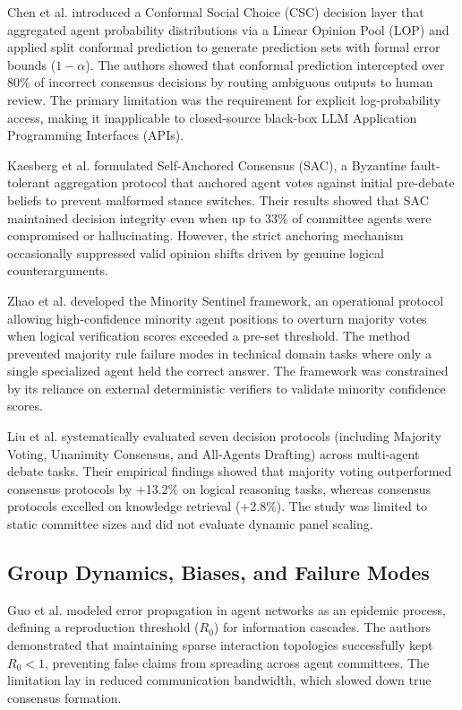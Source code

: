 \documentclass[a4paper,fleqn]{cas-sc}
\begin{document}
Chen et al. \cite{21} introduced a Conformal Social Choice (CSC) decision layer that aggregated agent probability distributions via a Linear Opinion Pool (LOP) and applied split conformal prediction to generate prediction sets with formal error bounds ($1 - \alpha$). The authors showed that conformal prediction intercepted over 80\% of incorrect consensus decisions by routing ambiguous outputs to human review. The primary limitation was the requirement for explicit log-probability access, making it inapplicable to closed-source black-box LLM Application Programming Interfaces (APIs).

Kaesberg et al. \cite{36} formulated Self-Anchored Consensus (SAC), a Byzantine fault-tolerant aggregation protocol that anchored agent votes against initial pre-debate beliefs to prevent malformed stance switches. Their results showed that SAC maintained decision integrity even when up to 33\% of committee agents were compromised or hallucinating. However, the strict anchoring mechanism occasionally suppressed valid opinion shifts driven by genuine logical counterarguments.

Zhao et al. \cite{23} developed the Minority Sentinel framework, an operational protocol allowing high-confidence minority agent positions to overturn majority votes when logical verification scores exceeded a pre-set threshold. The method prevented majority rule failure modes in technical domain tasks where only a single specialized agent held the correct answer. The framework was constrained by its reliance on external deterministic verifiers to validate minority confidence scores.

Liu et al. \cite{36} systematically evaluated seven decision protocols (including Majority Voting, Unanimity Consensus, and All-Agents Drafting) across multi-agent debate tasks. Their empirical findings showed that majority voting outperformed consensus protocols by +13.2\% on logical reasoning tasks, whereas consensus protocols excelled on knowledge retrieval (+2.8\%). The study was limited to static committee sizes and did not evaluate dynamic panel scaling.

\subsection{Group Dynamics, Biases, and Failure Modes}
Guo et al. \cite{8} modeled error propagation in agent networks as an epidemic process, defining a reproduction threshold ($R_0$) for information cascades. The authors demonstrated that maintaining sparse interaction topologies successfully kept $R_0 < 1$, preventing false claims from spreading across agent committees. The limitation lay in reduced communication bandwidth, which slowed down true consensus formation.
\end{document}
